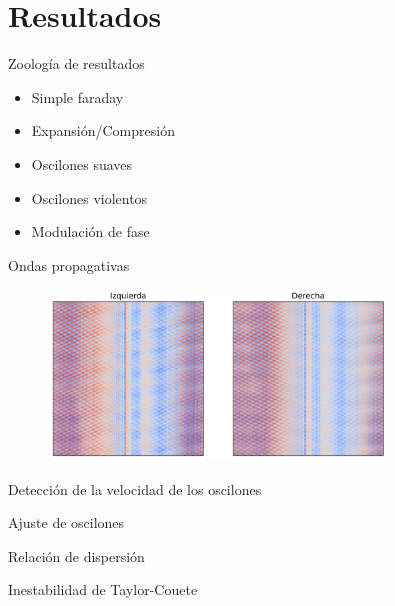 \documentclass[aspectratio=169]{beamer}
\begin{document}
\section{Resultados}

\begin{frame}{Zoología de resultados}
	\begin{itemize}
		\item Simple faraday
		\item Expansión/Compresión
		\item Oscilones suaves
		\item Oscilones violentos
		\item Modulación de fase
	\end{itemize}
\end{frame}

\begin{frame}{Ondas propagativas} %
	\begin{figure}[ht]
		\centering
		\includegraphics[width=0.8\textwidth]{figs/st_left_right.pdf}
	\end{figure}
\end{frame}

\begin{frame}{Detección de la velocidad de los oscilones} %
	
\end{frame}

\begin{frame}{Ajuste de oscilones} %
	
\end{frame}

\begin{frame}{Relación de dispersión} %
	
\end{frame}

\begin{frame}{Inestabilidad de Taylor-Couete} %
	
\end{frame}
\end{document}
